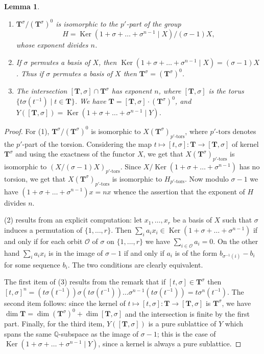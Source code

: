 \documentclass{amsart}
\newtheorem{lemma}[equation]{Lemma}
\numberwithin{equation}{section}
\theoremstyle{definition}
\theoremstyle{remark}
\newcommand\bT{{\mathbf T}}
\newcommand\BQ{{\mathbb Q}}
\newcommand\CO{{\mathcal O}}
\newcommand\Tso{{(\bT^\sigma)^0}}
\newcommand\Ts{{\bT^\sigma}}
\newcommand\inv{^{-1}}
\newcommand\ptors{{p'\text{-}\mathrm{tors}}}
\DeclareMathOperator\Ker{\mathrm{Ker}}
\begin{document}
\begin{lemma}\label{A(Ts)}
\begin{enumerate}
\item $\Ts/\Tso$ is isomorphic to the $p'$-part of the group
$$H=\Ker(1+\sigma+\ldots+\sigma^{n-1}\mid X)/(\sigma-1)X,$$ 
whose exponent divides $n$.
\item If $\sigma$ permutes a basis of $X$, then
$\Ker(1+\sigma+\ldots+\sigma^{n-1}\mid X)=(\sigma-1)X$.
Thus if $\sigma$ permutes a basis of $X$ then $\Ts=\Tso$.
\item The intersection $[\bT,\sigma]\cap\Ts$ has exponent $n$, where
\index{Tz@$[\bT,\sigma]$}
$[\bT,\sigma]$ is the torus $\{t\sigma(t\inv)\mid t\in\bT\}$.
We have $\bT=[\bT,\sigma]\cdot\Tso$, and $Y([\bT,\sigma])=
\Ker(1+\sigma+\ldots+\sigma^{n-1}\mid Y)$.
\end{enumerate}
\end{lemma}
\begin{proof}
For  (1), $\Ts/\Tso$ is isomorphic  to $X(\Ts)_\ptors$, where $\ptors$ denotes
the $p'$-part of the torsion. Considering the map
$t\mapsto[t,\sigma]:\bT\to[\bT,\sigma]$  of  kernel  $\Ts$  and  using  the
exactness  of the functor  $X$, we get  that $X(\Ts)_\ptors$ is isomorphic to
$(X/(\sigma-1)X)_\ptors$. Since
$X/\Ker(1+\sigma+\ldots+\sigma^{n-1})$  has  no  torsion,  we get that
$X(\Ts)_\ptors$  is  isomorphic  to  $H_\ptors$.  
Now  modulo $\sigma-1$  we  have
$(1+\sigma+\ldots+\sigma^{n-1})x=nx$ whence the assertion that the exponent
of $H$ divides $n$.

(2) results from an explicit computation: let $x_1,\ldots,x_r$ be a basis
of $X$ such that $\sigma$ induces a permutation of
$\{1,\ldots,r\}$. Then $\sum_i{a_i x_i}\in\Ker(1+\sigma+\ldots+\sigma^{n-1})$
if and only if  for each orbit $\CO$ of $\sigma$ on $\{1,\ldots,r\}$ we
have $\sum_{i\in\CO}a_i=0$. On the other hand $\sum_i{a_i x_i}$ is in the
image of $\sigma-1$ if and only if $a_i$ is of the form $b_{\sigma\inv(i)}-b_i$
for some sequence $b_i$. The two conditions are clearly equivalent.

The first item of (3) results from the remark that if $[t,\sigma]\in\Ts$
then $[t,\sigma]^n=(t\sigma(t\inv))\sigma(t\sigma(t\inv))\ldots
\sigma^{n-1}(t\sigma(t\inv))=t\sigma^n(t\inv)$. The second item follows:
since the kernel of $t\mapsto[t,\sigma]:\bT\to[\bT,\sigma]$ is $\Ts$,
we have $\dim\bT=\dim\Tso+\dim[\bT,\sigma]$ and the intersection is finite by
the first part. Finally, for the third item, $Y([\bT,\sigma])$ is a pure
sublattice  of $Y$ which spans the same $\BQ$-subspace as the image of
$\sigma-1$; this is the case of $\Ker(1+\sigma+\ldots+\sigma^{n-1}\mid Y)$,
since a kernel is always a pure sublattice.
\end{proof}
\end{document}
